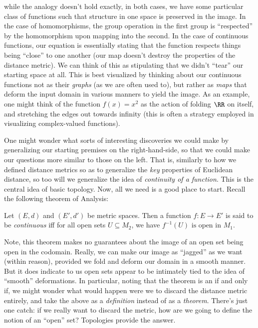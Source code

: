 \documentclass{fkbook}
\begin{document}
\begin{adjustwidth}{1em}{1em}
  while the analogy doesn't hold exactly, in both cases, we have some
  particular class of functions such that structure in one space is
  preserved in the image. In the case of homomorphisms, the group
  operation in the first group is ``respected'' by the homomorphism
  upon mapping into the second. In the case of continuous functions,
  our equation is essentially stating that the function respects
  things being ``close'' to one another (our map doesn't destroy the
  properties of the distance metric). We can think of this as
  stipulating that we didn't ``tear'' our starting space at all. This
  is best visualized by thinking about our continuous functions not as
  their \emph{graphs} (as we are often used to), but rather as
  \emph{maps} that deform the input domain in various manners to yield
  the image. As an example, one might think of the function $f(x) =
  x^2$ as the action of folding $\RR$ on itself, and stretching the
  edges out towards infinity (this is often a strategy employed in
  visualizing complex-valued functions).

  One might wonder what sorts of interesting discoveries we could make
  by generalizing our starting premises on the right-hand-side, so
  that we could make our questions more similar to those on the left.
  That is, similarly to how we defined distance metrics so as to
  generalize the \emph{key} properties of Euclidean distance, so too
  will we generalize the idea of \emph{continuity of a function}. This
  is the central idea of basic topology. Now, all we need is a good
  place to start. Recall the following theorem of Analysis:
  \begin{theorem}
    Let $(E,d)$ and $(E', d')$ be metric spaces. Then a function $f :
    E \to E'$ is said to be \emph{continuous} iff for all open sets $U
    \subseteq M_2$, we have $f^{-1}(U) \text{ is open in } M_1$.
  \end{theorem}
  Note, this theorem makes no guarantees about the image of an open
  set being open in the codomain. Really, we can make our image as
  ``jagged'' as we want (within reason), provided we fold and deform
  our domain in a smooth manner. But it does indicate to us open sets
  appear to be intimately tied to the idea of ``smooth'' deformations.
  In particular, noting that the theorem is an if and only if, we
  might wonder what would happen were we to discard the distance
  metric entirely, and take the above as a \emph{definition} instead
  of as a \emph{theorem}. There's just one catch: if we really want to
  discard the metric, how are we going to define the notion of an
  ``open'' set? Topologies provide the answer.

\end{adjustwidth}
\end{document}
